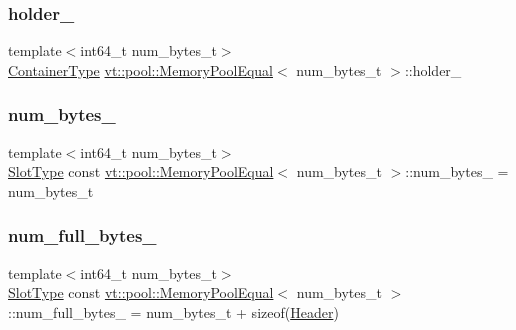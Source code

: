 \subsubsection{\texorpdfstring{holder\+\_\+}{holder\_}}
{\footnotesize\ttfamily template$<$int64\+\_\+t num\+\_\+bytes\+\_\+t$>$ \\
\hyperlink{structvt_1_1pool_1_1_memory_pool_equal_af0be2ff27778be95adc6dad823113c27}{Container\+Type} \hyperlink{structvt_1_1pool_1_1_memory_pool_equal}{vt\+::pool\+::\+Memory\+Pool\+Equal}$<$ num\+\_\+bytes\+\_\+t $>$\+::holder\+\_\+\hspace{0.3cm}{\ttfamily [private]}}

\mbox{\label{structvt_1_1pool_1_1_memory_pool_equal_a9f303ac0fffee08f71f676014d8114a6}} 
\subsubsection{\texorpdfstring{num\+\_\+bytes\+\_\+}{num\_bytes\_}}
{\footnotesize\ttfamily template$<$int64\+\_\+t num\+\_\+bytes\+\_\+t$>$ \\
\hyperlink{structvt_1_1pool_1_1_memory_pool_equal_a101fdcb943d0cb0863cf17655e0b4e1c}{Slot\+Type} const \hyperlink{structvt_1_1pool_1_1_memory_pool_equal}{vt\+::pool\+::\+Memory\+Pool\+Equal}$<$ num\+\_\+bytes\+\_\+t $>$\+::num\+\_\+bytes\+\_\+ = num\+\_\+bytes\+\_\+t\hspace{0.3cm}{\ttfamily [private]}}

\mbox{\label{structvt_1_1pool_1_1_memory_pool_equal_a3ae57a1929e619eb6d346f196e0b1d2d}} 
\subsubsection{\texorpdfstring{num\+\_\+full\+\_\+bytes\+\_\+}{num\_full\_bytes\_}}
{\footnotesize\ttfamily template$<$int64\+\_\+t num\+\_\+bytes\+\_\+t$>$ \\
\hyperlink{structvt_1_1pool_1_1_memory_pool_equal_a101fdcb943d0cb0863cf17655e0b4e1c}{Slot\+Type} const \hyperlink{structvt_1_1pool_1_1_memory_pool_equal}{vt\+::pool\+::\+Memory\+Pool\+Equal}$<$ num\+\_\+bytes\+\_\+t $>$\+::num\+\_\+full\+\_\+bytes\+\_\+ = num\+\_\+bytes\+\_\+t + sizeof(\hyperlink{structvt_1_1pool_1_1_header}{Header})\hspace{0.3cm}{\ttfamily [private]}}


